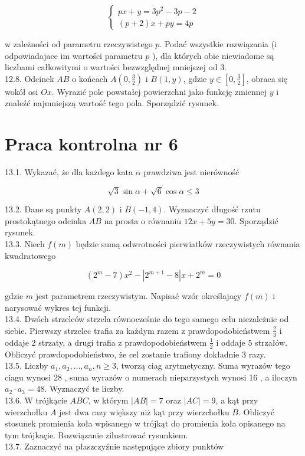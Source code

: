 \documentclass[10pt]{article}
\begin{document}
$$
\left\{\begin{array}{l}
p x+y=3 p^{2}-3 p-2 \\
(p+2) x+p y=4 p
\end{array}\right.
$$

w zależności od parametru rzeczywistego $p$. Podać wszystkie rozwiązania (i odpowiadajace im wartości parametru $p$ ), dla których obie niewiadome są liczbami całkowitymi o wartości bezwzględnej mniejszej od 3.\\
12.8. Odcinek $A B$ o końcach $A\left(0, \frac{3}{2}\right)$ i $B(1, y)$, gdzie $y \in\left[0, \frac{3}{2}\right]$, obraca się wokół osi $O x$. Wyrazić pole powstałej powierzchni jako funkcję zmiennej $y$ i znaleźć najmniejszą wartość tego pola. Sporządzić rysunek.

\section*{Praca kontrolna nr 6}
13.1. Wykazać, że dla każdego kata $\alpha$ prawdziwa jest nierówność

$$
\sqrt{3} \sin \alpha+\sqrt{6} \cos \alpha \leq 3
$$

13.2. Dane są punkty $A(2,2)$ i $B(-1,4)$. Wyznaczyć długość rzutu prostokątnego odcinka $A B$ na prosta o równaniu $12 x+5 y=30$. Sporządzić rysunek.\\
13.3. Niech $f(m)$ będzie sumą odwrotności pierwiatków rzeczywistych równania kwadratowego

$$
\left(2^{m}-7\right) x^{2}-\left|2^{m+1}-8\right| x+2^{m}=0
$$

gdzie $m$ jest parametrem rzeczywistym. Napisać wzór określajaçy $f(m)$ i narysować wykres tej funkcji.\\
13.4. Dwóch strzelców strzela równocześnie do tego samego celu niezależnie od siebie. Pierwszy strzelec trafia za każdym razem z prawdopodobieństwem $\frac{2}{3}$ i oddaje 2 strzaty, a drugi trafia z prawdopodobieństwem $\frac{1}{2}$ i oddaje 5 strzałów. Obliczyć prawdopodobieństwo, że cel zostanie trafiony dokładnie 3 razy.\\
13.5. Liczby $a_{1}, a_{2}, \ldots, a_{n}, n \geq 3$, tworzą ciag arytmetyczny. Suma wyrazów tego ciagu wynosi 28 , suma wyrazów o numerach nieparzystych wynosi 16 , a iloczyn $a_{2} \cdot a_{3}=48$. Wyznaczyć te liczby.\\
13.6. W trójkącie $A B C$, w którym $|A B|=7$ oraz $|A C|=9$, a kąt przy wierzchołku $A$ jest dwa razy większy niż kąt przy wierzchołku $B$. Obliczyć stosunek promienia koła wpisanego w trójkąt do promienia koła opisanego na tym trójkaçie. Rozwiązanie zilustrować rysunkiem.\\
13.7. Zaznaczyć na płaszczyźnie następujące zbiory punktów
\end{document}
